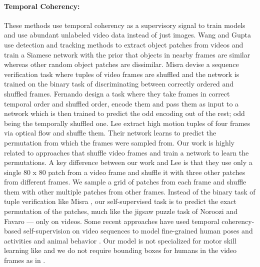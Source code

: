 \documentclass[10pt,twocolumn,letterpaper]{article}
\begin{document}
\paragraph{\textbf{Temporal Coherency:}}
These methods use temporal coherency as a supervisory signal to train models and use abundant unlabeled video data instead of just images. Wang and Gupta \cite{wang2015unsupervised} use detection and tracking methods to extract object patches from videos and train a Siamese network with the prior that objects in nearby frames are similar whereas other random object patches are dissimilar. Misra \etal \cite{misra2016shuffle} devise a sequence verification task where tuples of video frames are shuffled and the network is trained on the binary task of discriminating between correctly ordered and shuffled frames. Fernando \etal \cite{fernando2017self} design a task where they take frames in correct temporal order and shuffled order, encode them and pass them as input to a network which is then trained to predict the odd encoding out of the rest; odd being the temporally shuffled one. Lee \etal \cite{lee2017unsupervised} extract high motion tuples of four frames via optical flow and shuffle them. Their network learns to predict the permutation from which the frames were sampled from. Our work is highly related to approaches that shuffle video frames and train a network to learn the permutations. A key difference between our work and Lee \etal \cite{lee2017unsupervised} is that they use only a single 80 x 80 patch from a video frame and shuffle it with three other patches from different frames. We sample a grid of patches from each frame and shuffle them with other multiple patches from other frames. Instead of the binary task of tuple verification like Misra \etal \cite{misra2016shuffle}, our self-supervised task is to predict the exact permutation of the patches, much like the jigsaw puzzle task of Noroozi and Favaro \cite{noroozi2016unsupervised} --- only on videos. Some recent approaches have used temporal coherency-based self-supervision on video sequences to model fine-grained human poses and activities \cite{milbich2017unsupervised} and animal behavior \cite{brattoli2017lstm}. Our model is not specialized for motor skill learning like \cite{brattoli2017lstm} and we do not require bounding boxes for humans in the video frames as in \cite{milbich2017unsupervised}. 
\vspace{-2mm} 
\end{document}

